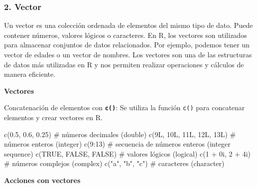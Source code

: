\documentclass[
  jou,
  floatsintext,
  longtable,
  a4paper,
  nolmodern,
  notxfonts,
  notimes,
  12pt,
  colorlinks=true,linkcolor=blue,citecolor=blue,urlcolor=blue]{apa7}
\newenvironment{Shaded}{\begin{snugshade}}{\end{snugshade}}
\newcommand{\CommentTok}[1]{\textcolor[rgb]{0.37,0.37,0.37}{#1}}
\newcommand{\ConstantTok}[1]{\textcolor[rgb]{0.56,0.35,0.01}{#1}}
\newcommand{\DecValTok}[1]{\textcolor[rgb]{0.68,0.00,0.00}{#1}}
\newcommand{\FloatTok}[1]{\textcolor[rgb]{0.68,0.00,0.00}{#1}}
\newcommand{\FunctionTok}[1]{\textcolor[rgb]{0.28,0.35,0.67}{#1}}
\newcommand{\NormalTok}[1]{\textcolor[rgb]{0.00,0.23,0.31}{#1}}
\newcommand{\SpecialCharTok}[1]{\textcolor[rgb]{0.37,0.37,0.37}{#1}}
\newcommand{\StringTok}[1]{\textcolor[rgb]{0.13,0.47,0.30}{#1}}
\begin{document}
\subsubsection{2. Vector}\label{vector}

Un vector es una colección ordenada de elementos del mismo tipo de dato.
Puede contener números, valores lógicos o caracteres. En R, los vectores
son utilizados para almacenar conjuntos de datos relacionados. Por
ejemplo, podemos tener un vector de edades o un vector de nombres. Los
vectores son una de las estructuras de datos más utilizadas en R y nos
permiten realizar operaciones y cálculos de manera eficiente.

\textbf{Vectores}

Concatenación de elementos con \textbf{\texttt{c()}}: Se utiliza la
función \texttt{c()} para concatenar elementos y crear vectores en R.

\begin{Shaded}
\begin{Highlighting}[]
\FunctionTok{c}\NormalTok{(}\FloatTok{0.5}\NormalTok{, }\FloatTok{0.6}\NormalTok{, }\FloatTok{0.25}\NormalTok{) }\CommentTok{\# números decimales (double)}
\FunctionTok{c}\NormalTok{(}\DecValTok{9}\NormalTok{L, }\DecValTok{10}\NormalTok{L, }\DecValTok{11}\NormalTok{L, }\DecValTok{12}\NormalTok{L, }\DecValTok{13}\NormalTok{L) }\CommentTok{\# números enteros (integer)}
\FunctionTok{c}\NormalTok{(}\DecValTok{9}\SpecialCharTok{:}\DecValTok{13}\NormalTok{) }\CommentTok{\# secuencia de números enteros (integer sequence)}
\FunctionTok{c}\NormalTok{(}\ConstantTok{TRUE}\NormalTok{, }\ConstantTok{FALSE}\NormalTok{, }\ConstantTok{FALSE}\NormalTok{) }\CommentTok{\# valores lógicos (logical)}
\FunctionTok{c}\NormalTok{(}\DecValTok{1} \SpecialCharTok{+} \DecValTok{0}\NormalTok{i, }\DecValTok{2} \SpecialCharTok{+} \DecValTok{4}\NormalTok{i) }\CommentTok{\# números complejos (complex)}
\FunctionTok{c}\NormalTok{(}\StringTok{"a"}\NormalTok{, }\StringTok{"b"}\NormalTok{, }\StringTok{"c"}\NormalTok{) }\CommentTok{\# caracteres (character)}
\end{Highlighting}
\end{Shaded}

\textbf{Acciones con vectores}
\end{document}
